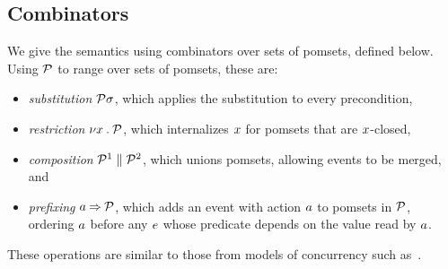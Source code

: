 

\subsection{Combinators}
\label{sec:combinators}
We give the semantics using combinators over sets of pomsets, defined below.
Using $\mathcal{P}$ to range over sets of pomsets, these are:
\begin{itemize}
\item \emph{substitution} $\mathcal{P}\sigma$, which applies the substitution to
  every precondition,
\item \emph{restriction} $\nu x\mathbin.\mathcal{P}$, which internalizes $x$ for
  pomsets that are $x$-closed,
\item \emph{composition} $\mathcal{P}^1\parallel\mathcal{P}^2$, which unions pomsets, allowing events to be merged, and
\item \emph{prefixing} $a\mathbin\Rightarrow\mathcal{P}$, which adds an event with action
  $a$ to pomsets in $\mathcal{P}$, ordering $a$ before any $e$ whose predicate
  depends on the value read by $a$.
\end{itemize}
These operations are similar to those from models of concurrency such
as~\cite{Brookes:1984:TCS:828.833}.

